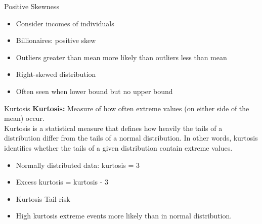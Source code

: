 \documentclass[10pt,dvipsnames, aspectratio=169]{beamer}
\begin{document}
\begin{frame}[t]{Positive Skewness}
	\begin{itemize}
		\item Consider incomes of individuals
		
		\item Billionaires: positive skew
		
		\item Outliers greater than mean more likely
		than outliers less than mean
		\item Right-skewed distribution
		\item Often seen when lower bound but no
		upper bound
		
	\end{itemize}
\end{frame}

\begin{frame}[t]{Kurtosis}
	\textbf{Kurtosis:} 
	Measure of how often extreme values (on either side of
	the mean) occur. \\ 
	Kurtosis is a statistical measure that defines how heavily the tails of a 
	distribution differ from the tails of a normal distribution. In other 
	words, 
	kurtosis identifies whether the tails of a given distribution contain 
	extreme 
	values.
	\begin{itemize}
		\item Normally distributed data: kurtosis = 3
		\item Excess kurtosis = kurtosis - 3
		\item Kurtosis Tail risk
		\item High kurtosis extreme events more
		likely than in normal distribution.
	\end{itemize}
\end{frame}
\end{document}
